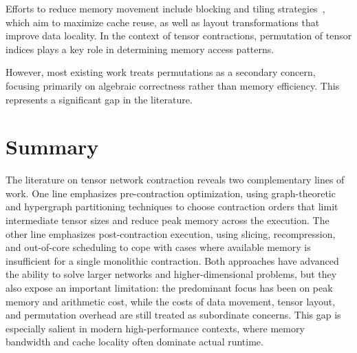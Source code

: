 Efforts to reduce memory movement include blocking and tiling strategies~\cite{li2019analytical, park2003tiling}, which aim to maximize cache reuse, as well as layout transformations that improve data locality. In the context of tensor contractions, permutation of tensor indices plays a key role in determining memory access patterns.

However, most existing work treats permutations as a secondary concern, focusing primarily on algebraic correctness rather than memory efficiency. This represents a significant gap in the literature.

\section{Summary}

The literature on tensor network contraction reveals two complementary lines of work. One line emphasizes pre-contraction optimization, using graph-theoretic and hypergraph partitioning techniques to choose contraction orders that limit intermediate tensor sizes and reduce peak memory across the execution. The other line emphasizes post-contraction execution, using slicing, recompression, and out-of-core scheduling to cope with cases where available memory is insufficient for a single monolithic contraction. Both approaches have advanced the ability to solve larger networks and higher-dimensional problems, but they also expose an important limitation: the predominant focus has been on peak memory and arithmetic cost, while the costs of data movement, tensor layout, and permutation overhead are still treated as subordinate concerns. This gap is especially salient in modern high-performance contexts, where memory bandwidth and cache locality often dominate actual runtime.